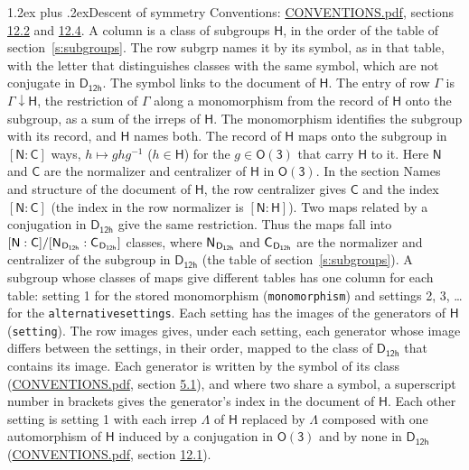\documentclass[10pt,a4paper]{article}
\makeatletter
\renewcommand\section{\@startsection{section}{1}{\z@}{-3ex plus -1ex minus -.2ex}%
  {1.2ex plus .2ex}{\normalfont\large\sffamily\bfseries\color{parttitle}}}
\numberwithin{equation}{section}
\newcommand{\grp}[1]{\mathsf{#1}}
\newcommand{\grpindex}[2]{[#1 : #2]}
\newcommand{\restr}[2]{#1\!\downarrow#2}
\newcommand{\hairsp}{\mkern1mu}
\makeatother
\begin{document}
\section{Descent of symmetry}\label{s:subduction}
Conventions: \href{../../CONVENTIONS.pdf}{CONVENTIONS.pdf}, sections \href{../../CONVENTIONS.pdf\#conv.12.2}{12.2} and \href{../../CONVENTIONS.pdf\#conv.12.4}{12.4}.
A column is a class of subgroups $\grp{H}$, in the order of the table of section~\ref{s:subgroups}. The row subgrp names it by its symbol, as in that table, with the letter that distinguishes classes with the same symbol, which are not conjugate in $\grp{D_{12h}}$. The symbol links to the document of $\grp{H}$. The entry of row $\Gamma$ is $\restr{\Gamma}{\grp{H}}$, the restriction of $\Gamma$ along a monomorphism from the record of $\grp{H}$ onto the subgroup, as a sum of the irreps of $\grp{H}$. The monomorphism identifies the subgroup with its record, and $\grp{H}$ names both. \label{n:group.normalizer.o3}\label{n:group.centralizer.o3}The record of $\grp{H}$ maps onto the subgroup in $\grpindex{\grp{N}}{\grp{C}}$ ways, $h \mapsto g h g^{-1}$ ($h \in \grp{H}$) for the $g \in \grp{O(3)}$ that carry $\grp{H}$ to it. Here $\grp{N}$ and $\grp{C}$ are the normalizer and centralizer of $\grp{H}$ in \href{O3.pdf}{$\grp{O(3)}$}. In the section Names and structure of the document of $\grp{H}$, the row centralizer gives $\grp{C}$ and the index $\grpindex{\grp{N}}{\grp{C}}$ (the index in the row normalizer is $\grpindex{\grp{N}}{\grp{H}}$). Two maps related by a conjugation in $\grp{D_{12h}}$ give the same restriction. Thus the maps fall into $\grpindex{\grp{N}}{\grp{C}}/\grpindex{\grp{N}_{\hairsp \grp{D_{12h}}}}{\grp{C}_{\hairsp \grp{D_{12h}}}}$ classes, where $\grp{N}_{\hairsp \grp{D_{12h}}}$ and $\grp{C}_{\hairsp \grp{D_{12h}}}$ are the normalizer and centralizer of the subgroup in $\grp{D_{12h}}$ (the table of section~\ref{s:subgroups}). \label{n:head.setting}A subgroup whose classes of maps give different tables has one column for each table: setting 1 for the stored monomorphism (\texttt{monomorphism}) and settings 2, 3, \dots{} for the \texttt{alternativesettings}. Each setting has the images of the generators of $\grp{H}$ (\texttt{setting}). \label{n:head.images}The row images gives, under each setting, each generator whose image differs between the settings, in their order, mapped to the class of $\grp{D_{12h}}$ that contains its image. \label{n:element.generator.index}Each generator is written by the symbol of its class (\href{../../CONVENTIONS.pdf}{CONVENTIONS.pdf}, section \href{../../CONVENTIONS.pdf\#conv.5.1}{5.1}), and where two share a symbol, a superscript number in brackets gives the generator's index in the document of $\grp{H}$. \label{n:irrep.Delta}Each other setting is setting 1 with each irrep $\Lambda$ of $\grp{H}$ replaced by $\Lambda$ composed with one automorphism of $\grp{H}$ induced by a conjugation in \href{O3.pdf}{$\grp{O(3)}$} and by none in $\grp{D_{12h}}$ (\href{../../CONVENTIONS.pdf}{CONVENTIONS.pdf}, section \href{../../CONVENTIONS.pdf\#conv.12.1}{12.1}).
\end{document}
